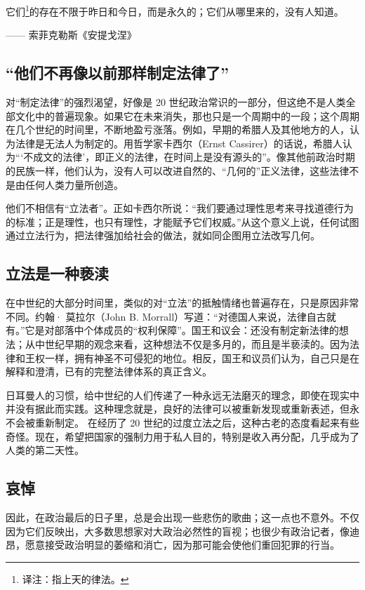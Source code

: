 \begin{tcolorbox}
它们\footnote{译注：指上天的律法。}的存在不限于昨日和今日，而是永久的；它们从哪里来的，没有人知道。
\begin{flushright}
—— 索菲克勒斯《安提戈涅》 
\end{flushright}
\end{tcolorbox}


\subsection{“他们不再像以前那样制定法律了”}

对“制定法律”的强烈渴望，好像是 20 世纪政治常识的一部分，但这绝不是人类全部文化中的普遍现象。如果它在未来消失，那也只是一个周期中的一段；这个周期在几个世纪的时间里，不断地盈亏涨落。例如，早期的希腊人及其他地方的人，认为法律是无法人为制定的。用哲学家卡西尔（Ernst Cassirer）的话说，希腊人认为“‘不成文的法律’，即正义的法律，在时间上是没有源头的”。像其他前政治时期的民族一样，他们认为，没有人可以改进自然的、“几何的”正义法律，这些法律不是由任何人类力量所创造。

他们不相信有“立法者”。正如卡西尔所说：“我们要通过理性思考来寻找道德行为的标准；正是理性，也只有理性，才能赋予它们权威。”从这个意义上说，任何试图通过立法行为，把法律强加给社会的做法，就如同企图用立法改写几何。

\subsection{立法是一种亵渎}
在中世纪的大部分时间里，类似的对“立法”的抵触情绪也普遍存在，只是原因非常不同。约翰· 莫拉尔（John B. Morrall）写道：“对德国人来说，法律自古就有。”它是对部落中个体成员的“权利保障”。国王和议会：还没有制定新法律的想法；从中世纪早期的观念来看，这种想法不仅是多月的，而且是半亵渎的。因为法律和王权一样，拥有神圣不可侵犯的地位。相反，国王和议员们认为，自己只是在解释和澄清，已有的完整法律体系的真正含义。

日耳曼人的习惯，给中世纪的人们传递了一种永远无法磨灭的理念，即使在现实中并没有据此而实践。这种理念就是，良好的法律可以被重新发现或重新表述，但永不会被重新制定。 在经历了 20 世纪的过度立法之后，这种古老的态度看起来有些奇怪。现在，希望把国家的强制力用于私人目的，特别是收入再分配，几乎成为了人类的第二天性。

\subsection{哀悼}
因此，在政治最后的日子里，总是会出现一些悲伤的歌曲；这一点也不意外。不仅因为它们反映出，大多数思想家对大政治必然性的盲视；也很少有政治记者，像迪昂，愿意接受政治明显的萎缩和消亡，因为那可能会使他们重回犯罪的行当。

